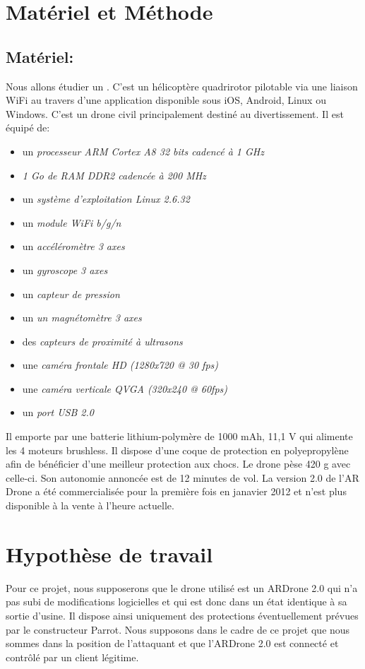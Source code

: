 \section{Matériel et Méthode}
\subsection{Matériel: }
Nous allons étudier un . C'est un hélicoptère quadrirotor pilotable via une liaison WiFi au travers d'une application disponible sous iOS, Android, Linux ou Windows. C'est un drone civil principalement destiné au divertissement. Il est équipé de:
\medbreak
\begin{itemize}
    \item un \textit{processeur ARM Cortex A8 32 bits cadencé à 1 GHz}
    \item \textit{1 Go de RAM DDR2 cadencée à 200 MHz}
    \item un \textit{système d'exploitation Linux 2.6.32}
    \item un \textit{module WiFi b/g/n}
    \item un \textit{accéléromètre 3 axes}
    \item un \textit{gyroscope 3 axes}
    \item un \textit{capteur de pression}
    \item un \textit{un magnétomètre 3 axes}
    \item des \textit{capteurs de proximité à ultrasons}
    \item une \textit{caméra frontale HD (1280x720 @ 30 fps)}
    \item une \textit{caméra verticale QVGA (320x240 @ 60fps)}
    \item un \textit{port USB 2.0}
\end{itemize}

Il emporte par une batterie lithium-polymère de 1000 mAh, 11,1 V qui alimente les 4 moteurs brushless. Il dispose d'une coque de protection en polyepropylène afin de bénéficier d'une meilleur protection aux chocs. Le drone pèse 420 g avec celle-ci. Son autonomie annoncée est de 12 minutes de vol. La version 2.0 de l'AR Drone a été commercialisée pour la première fois en janavier 2012 et n'est plus disponible à la vente à l'heure actuelle.


\section{Hypothèse de travail}
Pour ce projet, nous supposerons que le drone utilisé est un ARDrone 2.0 qui n'a pas subi de modifications logicielles et qui est donc dans un état identique à sa sortie d'usine. Il dispose ainsi uniquement des protections éventuellement prévues par le constructeur Parrot. Nous supposons dans le cadre de ce projet que nous sommes  dans la position de l'attaquant et que l'ARDrone 2.0 est connecté et contrôlé par un client légitime.
